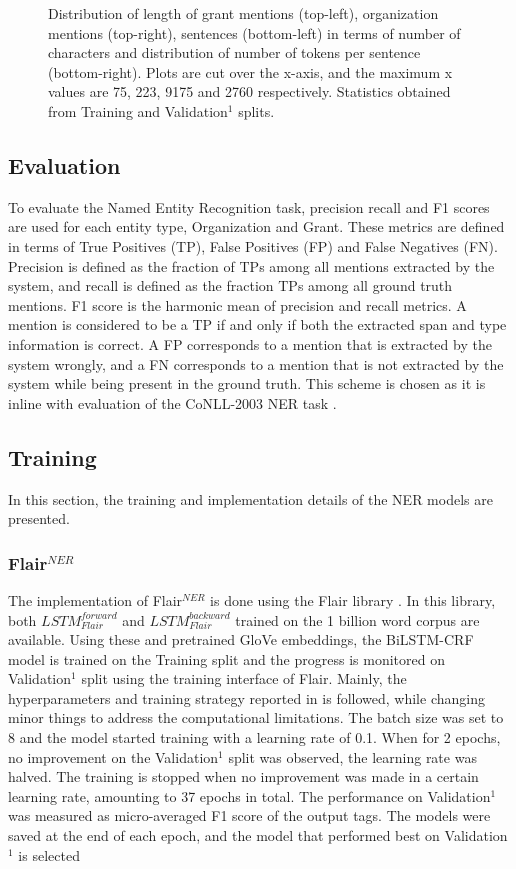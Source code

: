 \documentclass{report}
\theoremstyle{definition}
\theoremstyle{remark}
\begin{document}
\begin{figure}[h!]
    \caption{Distribution of length of grant mentions (top-left), organization mentions (top-right), sentences (bottom-left) in terms of number of characters and distribution of number of tokens per sentence (bottom-right). Plots are cut over the x-axis, and the maximum x values are 75, 223, 9175 and 2760 respectively. Statistics obtained from Training and Validation$^1$ splits.}
    \label{fig:nerdatalen}
\end{figure}

\subsection{Evaluation}
\label{sec:NEReval}
To evaluate the Named Entity Recognition task, precision recall and F1 scores are used for each entity type, Organization and Grant. These metrics are defined in terms of True Positives (TP), False Positives (FP) and False Negatives (FN). Precision is defined as the fraction of TPs among all mentions extracted by the system, and recall is defined as the fraction TPs among all ground truth mentions. F1 score is the harmonic mean of precision and recall metrics. A mention is considered to be a TP if and only if both the extracted span and type information is correct. A FP corresponds to a mention that is extracted by the system wrongly, and a FN corresponds to a mention that is not extracted by the system while being present in the ground truth. This scheme is chosen as it is inline with evaluation of the CoNLL-2003 NER task \cite{conll}.
\subsection{Training}
\label{sec:trainingIthink}
In this section, the training and implementation details of the NER models are presented.
\subsubsection{Flair$^{NER}$}
The implementation of Flair$^{NER}$ is done using the Flair library \cite{flairlib}. In this library, both $LSTM^{forward}_{Flair}$ and $LSTM^{backward}_{Flair}$ trained on the 1 billion word corpus \cite{onebillion} are available. Using these and pretrained GloVe embeddings, the BiLSTM-CRF model is trained on the Training split and the progress is monitored on Validation$^1$ split using the training interface of Flair.  Mainly, the hyperparameters and training strategy reported in \cite{flairpaper} is followed, while changing minor things to address the computational limitations. The batch size was set to 8 and the model started training with a learning rate of 0.1. When for 2 epochs, no improvement on the Validation$^1$ split was observed, the learning rate was halved. The training is stopped when no improvement was made in a certain learning rate, amounting to 37 epochs in total. The performance on Validation$^1$ was measured as micro-averaged F1 score of the output tags. The models were saved at the end of each epoch, and the model that performed best on Validation$^1$ is selected
\end{document}
